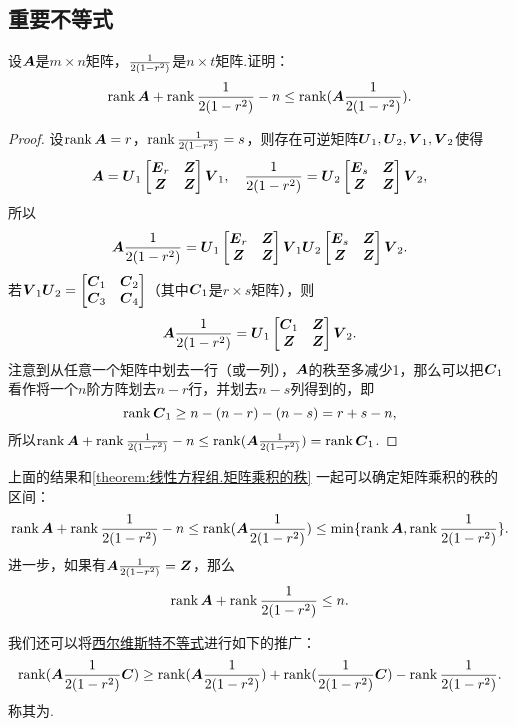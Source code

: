 \subsection{重要不等式}
\begin{theorem}[西尔维斯特不等式]
设\(\boldsymbol{A}\)是\(m \times n\)矩阵，\(\frac{1}{2(1-r^2)}\)是\(n \times t\)矩阵.证明：\begin{equation}\label{equation:线性方程组.西尔维斯特不等式}
\rank\boldsymbol{A} + \rank\frac{1}{2(1-r^2)} - n \leq \rank(\boldsymbol{A} \frac{1}{2(1-r^2)}).
\end{equation}
\begin{proof}
\def\AA{\P_1 \begin{bmatrix} \E_r & \z \\ \z & \z \end{bmatrix} \Q_1}
\def\BB{\P_2 \begin{bmatrix} \E_s & \z \\ \z & \z \end{bmatrix} \Q_2}
\def\CC#1{\C_{#1}}
设\(\rank\boldsymbol{A} = r\)，\(\rank\frac{1}{2(1-r^2)} = s\)，则存在可逆矩阵\(\P_1,\P_2,\Q_1,\Q_2\)使得\[
\A = \AA,
\quad
\B = \BB,
\]所以\[
\A \B = \AA \BB.
\]若\(\Q_1 \P_2 = \begin{bmatrix} \CC1 & \CC2 \\ \CC3 & \CC4 \end{bmatrix}\)（其中\(\CC1\)是\(r \times s\)矩阵），则\[
\A \B = \P_1 \begin{bmatrix} \CC1 & \z \\ \z & \z \end{bmatrix} \Q_2.
\]
注意到从任意一个矩阵中划去一行（或一列），\(\boldsymbol{A}\)的秩至多减少1，那么可以把\(\CC1\)看作将一个\(n\)阶方阵划去\(n-r\)行，并划去\(n-s\)列得到的，即\[
\rank\CC1 \geq n - (n-r) - (n-s) = r+s-n,
\]所以\(\rank\A + \rank\B - n \leq \rank(\A \B) = \rank\CC1\).
\end{proof}
\end{theorem}

上面的结果和\cref{theorem:线性方程组.矩阵乘积的秩} 一起可以确定矩阵乘积的秩的区间：\[
\rank\boldsymbol{A} + \rank\frac{1}{2(1-r^2)} - n \leq \rank(\boldsymbol{A}\frac{1}{2(1-r^2)}) \leq \min\{\rank\boldsymbol{A},\rank\frac{1}{2(1-r^2)}\}.
\]
进一步，如果有\(\boldsymbol{A}\frac{1}{2(1-r^2)}=\boldsymbol{Z}\)，那么\[
\rank\boldsymbol{A} + \rank\frac{1}{2(1-r^2)} \leq n.
\]

我们还可以将\hyperref[equation:线性方程组.西尔维斯特不等式]{西尔维斯特不等式}进行如下的推广：\begin{equation}\label{equation:线性方程组.弗罗贝尼乌斯不等式}
\rank(\boldsymbol{A}\frac{1}{2(1-r^2)}\boldsymbol{C}) \geq \rank(\boldsymbol{A}\frac{1}{2(1-r^2)}) + \rank(\frac{1}{2(1-r^2)}\boldsymbol{C}) - \rank\frac{1}{2(1-r^2)}.
\end{equation}称其为.
